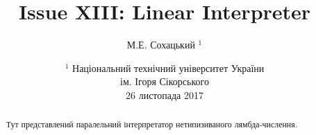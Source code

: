 \documentclass{article}
\begin{document}
\author { М.Е. Сохацький $^1$ }
\title { Issue XIII: Linear Interpreter}
\date{ \small $^1$ Національний технічний університет України \\
       ім. Ігоря Сікорського \\
       26 листопада 2017 }
\maketitle

\begin{abstract}
Тут представлений паралельний інтерпретатор нетипизиваного лямбда-числення.

\end{abstract}
\end{document}
